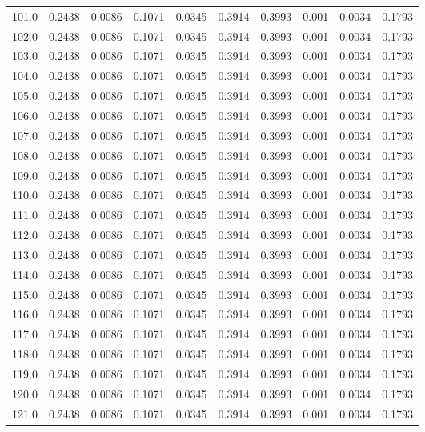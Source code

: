 \begin{longtable}{lrrrrrrrrr}
101.0 & 0.2438 & 0.0086 & 0.1071 & 0.0345 & 0.3914 & 0.3993 & 0.001 & 0.0034 & 0.1793 \\
102.0 & 0.2438 & 0.0086 & 0.1071 & 0.0345 & 0.3914 & 0.3993 & 0.001 & 0.0034 & 0.1793 \\
103.0 & 0.2438 & 0.0086 & 0.1071 & 0.0345 & 0.3914 & 0.3993 & 0.001 & 0.0034 & 0.1793 \\
104.0 & 0.2438 & 0.0086 & 0.1071 & 0.0345 & 0.3914 & 0.3993 & 0.001 & 0.0034 & 0.1793 \\
105.0 & 0.2438 & 0.0086 & 0.1071 & 0.0345 & 0.3914 & 0.3993 & 0.001 & 0.0034 & 0.1793 \\
106.0 & 0.2438 & 0.0086 & 0.1071 & 0.0345 & 0.3914 & 0.3993 & 0.001 & 0.0034 & 0.1793 \\
107.0 & 0.2438 & 0.0086 & 0.1071 & 0.0345 & 0.3914 & 0.3993 & 0.001 & 0.0034 & 0.1793 \\
108.0 & 0.2438 & 0.0086 & 0.1071 & 0.0345 & 0.3914 & 0.3993 & 0.001 & 0.0034 & 0.1793 \\
109.0 & 0.2438 & 0.0086 & 0.1071 & 0.0345 & 0.3914 & 0.3993 & 0.001 & 0.0034 & 0.1793 \\
110.0 & 0.2438 & 0.0086 & 0.1071 & 0.0345 & 0.3914 & 0.3993 & 0.001 & 0.0034 & 0.1793 \\
111.0 & 0.2438 & 0.0086 & 0.1071 & 0.0345 & 0.3914 & 0.3993 & 0.001 & 0.0034 & 0.1793 \\
112.0 & 0.2438 & 0.0086 & 0.1071 & 0.0345 & 0.3914 & 0.3993 & 0.001 & 0.0034 & 0.1793 \\
113.0 & 0.2438 & 0.0086 & 0.1071 & 0.0345 & 0.3914 & 0.3993 & 0.001 & 0.0034 & 0.1793 \\
114.0 & 0.2438 & 0.0086 & 0.1071 & 0.0345 & 0.3914 & 0.3993 & 0.001 & 0.0034 & 0.1793 \\
115.0 & 0.2438 & 0.0086 & 0.1071 & 0.0345 & 0.3914 & 0.3993 & 0.001 & 0.0034 & 0.1793 \\
116.0 & 0.2438 & 0.0086 & 0.1071 & 0.0345 & 0.3914 & 0.3993 & 0.001 & 0.0034 & 0.1793 \\
117.0 & 0.2438 & 0.0086 & 0.1071 & 0.0345 & 0.3914 & 0.3993 & 0.001 & 0.0034 & 0.1793 \\
118.0 & 0.2438 & 0.0086 & 0.1071 & 0.0345 & 0.3914 & 0.3993 & 0.001 & 0.0034 & 0.1793 \\
119.0 & 0.2438 & 0.0086 & 0.1071 & 0.0345 & 0.3914 & 0.3993 & 0.001 & 0.0034 & 0.1793 \\
120.0 & 0.2438 & 0.0086 & 0.1071 & 0.0345 & 0.3914 & 0.3993 & 0.001 & 0.0034 & 0.1793 \\
121.0 & 0.2438 & 0.0086 & 0.1071 & 0.0345 & 0.3914 & 0.3993 & 0.001 & 0.0034 & 0.1793 \\

\end{longtable}
